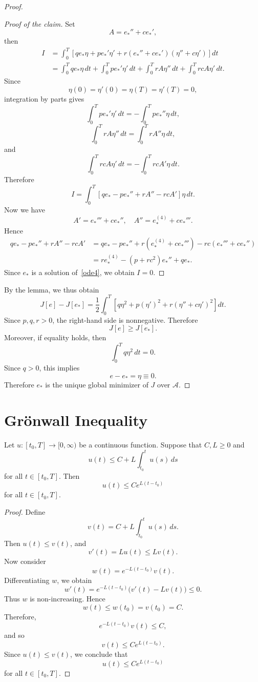 ﻿\documentclass[12pt]{article}
\begin{document}
\begin{proof}
\begin{proof}[Proof of the claim]
Set
\[
 A = e_*'' + ce_*',
\]
then
\begin{align*}
 I
 & = \int_0^T
 \left[
 qe_*\eta
 +
 pe_*'\eta'
 +
 r(e_*'' + ce_*')(\eta'' + c\eta')
 \right]dt\\
 & = \int_0^T qe_*\eta\, dt
 + \int_0^T pe_*'\eta'\, dt
 + \int_0^T rA\eta''\, dt
 + \int_0^T rcA\eta'\, dt.
\end{align*}
Since
\[
 \eta(0) = \eta'(0) = \eta(T) = \eta'(T) = 0,
\]
integration by parts gives
\[ \int_0^T pe_*'\eta'\, dt = - \int_0^T pe_*''\eta\, dt,
\]
\[ \int_0^T rA\eta''\, dt = \int_0^T rA''\eta\, dt,
\]
and
\[ \int_0^T rcA\eta'\, dt = - \int_0^T rcA'\eta\, dt.
\]
Therefore
\[
 I = \int_0^T \left[ qe_* - pe_*'' + rA'' - rcA' \right]\eta\, dt.
\]
Now we have
\[
 A' = e_*''' + ce_*'',\quad A'' = e_*^{(4)} + ce_*'''.
\]
Hence
\begin{align*}
 qe_*
 -
 pe_*''
 +
 rA''
 -
 rcA'
 & =
 qe_*
 -
 pe_*''
 +
 r(e_*^{(4)} + ce_*''')
 -
 rc(e_*''' + ce_*'')\\
 & =
 re_*^{(4)}
 -
 (p + rc^2)e_*''
 +
 qe_*.
\end{align*}
Since $e_*$ is a solution of~\eqref{ode4}, we obtain $I = 0.$
\end{proof}
By the lemma, we thus obtain
\[
 J[e] - J[e_*] = \frac{1}{2} \int_0^T \left[ q\eta^2 + p(\eta')^2 + r(\eta'' + c\eta')^2 \right]dt.
\]
Since $p, q, r > 0$, the right-hand side is nonnegative. Therefore
\[
 J[e] \geq J[e_*].
\]
Moreover, if equality holds, then
\[ \int_0^T q\eta^2\, dt = 0.
\]
Since $q > 0$, this implies
\[
 e - e_* = \eta\equiv 0.
\]
Therefore $e_*$ is the unique global minimizer of $J$ over $\mathcal A$.
\end{proof}
\section{Grönwall Inequality}
\begin{theorem}\label{gronwall}
Let $u:[t_0, T] \to [0, \infty)$ be a continuous function. 
Suppose that $C, L\ge 0$ and
\[
 u(t)\le C + L \int_{t_0}^{t}u(s)\, ds
\]
for all $t \in [t_0, T]$. Then
\[
 u(t)\le Ce^{L(t - t_0)}
\]
for all $t \in [t_0, T]$.
\end{theorem}

\begin{proof}
Define
\[
 v(t) = C + L \int_{t_0}^{t}u(s)\, ds.
\]
Then $u(t)\le v(t)$, and
\[
 v'(t) = Lu(t)\le Lv(t).
\]
Now consider
\[
 w(t) = e^{-L(t - t_0)}v(t).
\]
Differentiating $w$, we obtain
\[
 w'(t)
 =
 e^{-L(t - t_0)}\bigl(v'(t) - Lv(t)\bigr)
 \le 0.
\]
Thus $w$ is non-increasing. Hence
\[
 w(t)\le w(t_0) = v(t_0) = C.
\]
Therefore,
\[
 e^{-L(t - t_0)}v(t)\le C,
\]
and so
\[
 v(t)\le Ce^{L(t - t_0)}.
\]
Since $u(t)\le v(t)$, we conclude that
\[
 u(t)\le Ce^{L(t - t_0)}
\]
for all $t \in [t_0, T]$.
\end{proof}
\end{document}
